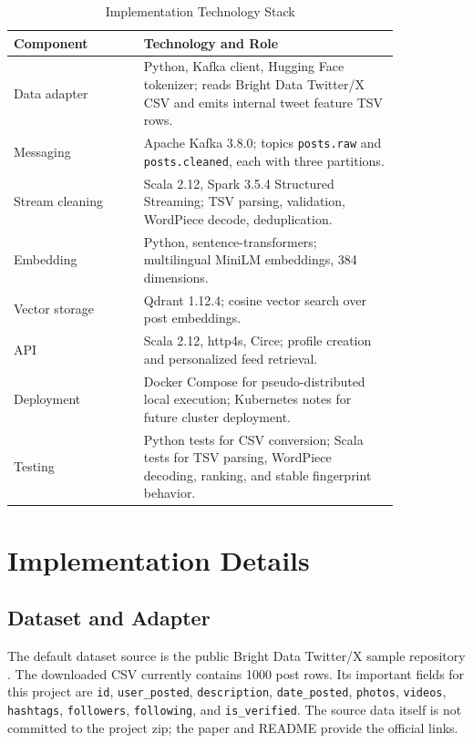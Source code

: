 \documentclass[conference]{IEEEtran}
\begin{document}
\begin{table}[htbp]
\caption{Implementation Technology Stack}
\begin{center}
\begin{tabular}{p{0.29\linewidth} p{0.55\linewidth}}
\toprule
\textbf{Component} & \textbf{Technology and Role}\\
\midrule
Data adapter & Python, Kafka client, Hugging Face tokenizer; reads Bright Data Twitter/X CSV and emits internal tweet feature TSV rows.\\
Messaging & Apache Kafka 3.8.0; topics \texttt{posts.raw} and \texttt{posts.cleaned}, each with three partitions.\\
Stream cleaning & Scala 2.12, Spark 3.5.4 Structured Streaming; TSV parsing, validation, WordPiece decode, deduplication.\\
Embedding & Python, sentence-transformers; multilingual MiniLM embeddings, 384 dimensions.\\
Vector storage & Qdrant 1.12.4; cosine vector search over post embeddings.\\
API & Scala 2.12, http4s, Circe; profile creation and personalized feed retrieval.\\
Deployment & Docker Compose for pseudo-distributed local execution; Kubernetes notes for future cluster deployment.\\
Testing & Python tests for CSV conversion; Scala tests for TSV parsing, WordPiece decoding, ranking, and stable fingerprint behavior.\\
\bottomrule
\end{tabular}
\label{tab:stack}
\end{center}
\end{table}

\section{Implementation Details}
\subsection{Dataset and Adapter}
The default dataset source is the public Bright Data Twitter/X sample repository \cite{brightdataGithub}. The downloaded CSV currently contains 1000 post rows. Its important fields for this project are \texttt{id}, \texttt{user\_posted}, \texttt{description}, \texttt{date\_posted}, \texttt{photos}, \texttt{videos}, \texttt{hashtags}, \texttt{followers}, \texttt{following}, and \texttt{is\_verified}. The source data itself is not committed to the project zip; the paper and README provide the official links.
\end{document}
